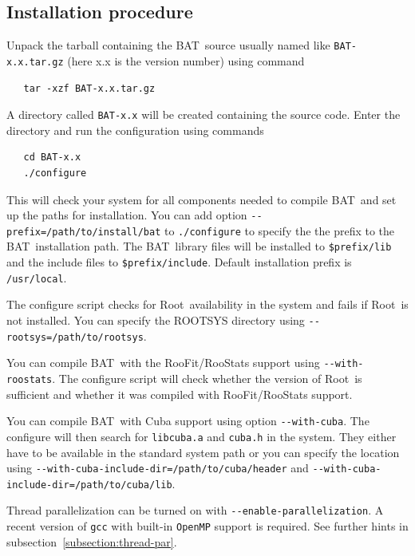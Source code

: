 \documentclass[11pt, a4paper]{article}
\newcommand{\bat}{{\sc BAT}}
\newcommand{\BAT}{\bat}
\newcommand{\Root}{{\sc Root}}
\begin{document}

\subsection{Installation procedure}

Unpack the tarball containing the \bat\ source usually named like
\verb|BAT-x.x.tar.gz| (here x.x is the version number) using command
%
\begin{verbatim}
   tar -xzf BAT-x.x.tar.gz
\end{verbatim}
%
A directory called \verb|BAT-x.x| will be created containing the source code.
Enter the directory and run the configuration using commands
%
\begin{verbatim}
   cd BAT-x.x
   ./configure
\end{verbatim}

This will check your system for all components needed to compile \bat\
and set up the paths for installation. You can add option
\verb|--prefix=/path/to/install/bat| to \verb|./configure| to specify
the the prefix to the \bat\ installation path. The \bat\ library files
will be installed to \verb|$prefix/lib| and the include files to
\verb|$prefix/include|. Default installation prefix is
\verb|/usr/local|.

The configure script checks for \Root\ availability in the system and
fails if \Root\ is not installed. You can specify the ROOTSYS directory
using \verb|--rootsys=/path/to/rootsys|.

You can compile \BAT\ with the RooFit/RooStats support using
\verb|--with-roostats|. The configure script will check whether the version of
\Root\ is sufficient and whether it was compiled with RooFit/RooStats
support.

You can compile \BAT\ with Cuba support using option \verb|--with-cuba|.
The configure will then search for \verb|libcuba.a| and \verb|cuba.h| in
the system. They either have to be available in the standard system path
or you can specify the location using
\verb|--with-cuba-include-dir=/path/to/cuba/header|
and \verb|--with-cuba-include-dir=/path/to/cuba/lib|.

Thread parallelization can be turned on with \verb|--enable-parallelization|. A
recent version of \verb|gcc| with built-in \verb|OpenMP| support is
required. See further hints in subsection~\ref{subsection:thread-par}.
\end{document}
